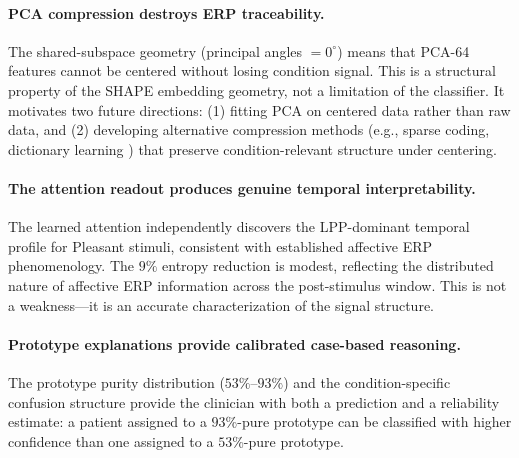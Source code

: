 \paragraph{PCA compression destroys ERP traceability.} The shared-subspace geometry (principal angles $= 0^\circ$) means that PCA-64 features cannot be centered without losing condition signal. This is a structural property of the SHAPE embedding geometry, not a limitation of the classifier. It motivates two future directions: (1) fitting PCA on centered data rather than raw data, and (2) developing alternative compression methods (e.g., sparse coding, dictionary learning \cite{tang_sparse_snn_2017}) that preserve condition-relevant structure under centering.

\paragraph{The attention readout produces genuine temporal interpretability.} The learned attention independently discovers the LPP-dominant temporal profile for Pleasant stimuli, consistent with established affective ERP phenomenology. The $9\%$ entropy reduction is modest, reflecting the distributed nature of affective ERP information across the post-stimulus window. This is not a weakness---it is an accurate characterization of the signal structure.

\paragraph{Prototype explanations provide calibrated case-based reasoning.} The prototype purity distribution ($53\%$--$93\%$) and the condition-specific confusion structure provide the clinician with both a prediction and a reliability estimate: a patient assigned to a $93\%$-pure prototype can be classified with higher confidence than one assigned to a $53\%$-pure prototype.

